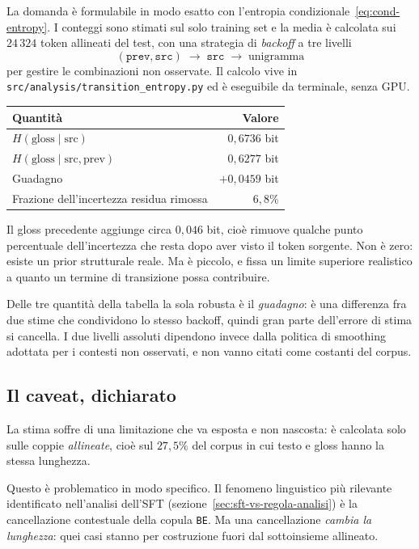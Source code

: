 La domanda è formulabile in modo esatto con l'entropia
condizionale~\eqref{eq:cond-entropy}. I conteggi sono stimati sul solo training
set e la media è calcolata sui $24\,324$ token allineati del test, con una
strategia di \emph{backoff} a tre livelli
\begin{equation}
  (\texttt{prev}, \texttt{src}) \;\to\; \texttt{src} \;\to\; \text{unigramma}
\end{equation}
per gestire le combinazioni non osservate. Il calcolo vive in
\texttt{src/analysis/transition\_entropy.py} ed è eseguibile da terminale, senza
GPU.

\begin{center}
\begin{tabular}{lr}
\toprule
Quantità & Valore \\
\midrule
$H(\text{gloss} \mid \text{src})$ & $0{,}6736$ bit \\
$H(\text{gloss} \mid \text{src}, \text{prev})$ & $0{,}6277$ bit \\
\midrule
Guadagno & $+0{,}0459$ bit \\
Frazione dell'incertezza residua rimossa & $6{,}8\%$ \\
\bottomrule
\end{tabular}
\end{center}

Il gloss precedente aggiunge circa $0{,}046$ bit, cioè rimuove qualche punto
percentuale dell'incertezza che resta dopo aver visto il token sorgente. Non è
zero: esiste un prior strutturale reale. Ma è piccolo, e fissa un limite
superiore realistico a quanto un termine di transizione possa contribuire.

Delle tre quantità della tabella la sola robusta è il \emph{guadagno}: è una
differenza fra due stime che condividono lo stesso backoff, quindi gran parte
dell'errore di stima si cancella. I due livelli assoluti dipendono invece dalla
politica di smoothing adottata per i contesti non osservati, e non vanno citati
come costanti del corpus.

\subsection{Il caveat, dichiarato}

La stima soffre di una limitazione che va esposta e non nascosta: è calcolata
solo sulle coppie \emph{allineate}, cioè sul $27{,}5\%$ del corpus in cui testo e
gloss hanno la stessa lunghezza.

Questo è problematico in modo specifico. Il fenomeno linguistico più rilevante
identificato nell'analisi dell'SFT (sezione~\ref{sec:sft-vs-regola-analisi}) è la
cancellazione contestuale della copula \texttt{BE}. Ma una cancellazione
\emph{cambia la lunghezza}: quei casi stanno per costruzione fuori dal
sottoinsieme allineato.

